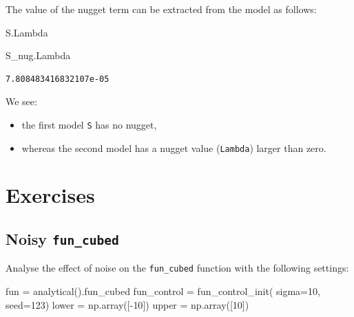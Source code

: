 \documentclass[
  letterpaper,
  DIV=11,
  numbers=noendperiod]{scrreprt}
\newenvironment{Shaded}{\begin{snugshade}}{\end{snugshade}}
\newcommand{\DecValTok}[1]{\textcolor[rgb]{0.68,0.00,0.00}{#1}}
\newcommand{\NormalTok}[1]{\textcolor[rgb]{0.00,0.23,0.31}{#1}}
\newcommand{\OperatorTok}[1]{\textcolor[rgb]{0.37,0.37,0.37}{#1}}
\providecommand{\tightlist}{%
  \setlength{\itemsep}{0pt}\setlength{\parskip}{0pt}}\usepackage{longtable,booktabs,array}
\begin{document}
The value of the nugget term can be extracted from the model as follows:

\begin{Shaded}
\begin{Highlighting}[]
\NormalTok{S.Lambda}
\end{Highlighting}
\end{Shaded}

\begin{Shaded}
\begin{Highlighting}[]
\NormalTok{S\_nug.Lambda}
\end{Highlighting}
\end{Shaded}

\begin{verbatim}
7.808483416832107e-05
\end{verbatim}

We see:

\begin{itemize}
\tightlist
\item
  the first model \texttt{S} has no nugget,
\item
  whereas the second model has a nugget value (\texttt{Lambda}) larger
  than zero.
\end{itemize}

\section{Exercises}\label{exercises-7}

\subsection{\texorpdfstring{Noisy
\texttt{fun\_cubed}}{Noisy fun\_cubed}}\label{noisy-fun_cubed-1}

Analyse the effect of noise on the \texttt{fun\_cubed} function with the
following settings:

\begin{Shaded}
\begin{Highlighting}[]
\NormalTok{fun }\OperatorTok{=}\NormalTok{ analytical().fun\_cubed}
\NormalTok{fun\_control }\OperatorTok{=}\NormalTok{ fun\_control\_init(    }
\NormalTok{    sigma}\OperatorTok{=}\DecValTok{10}\NormalTok{,}
\NormalTok{    seed}\OperatorTok{=}\DecValTok{123}\NormalTok{)}
\NormalTok{lower }\OperatorTok{=}\NormalTok{ np.array([}\OperatorTok{{-}}\DecValTok{10}\NormalTok{])}
\NormalTok{upper }\OperatorTok{=}\NormalTok{ np.array([}\DecValTok{10}\NormalTok{])}
\end{Highlighting}
\end{Shaded}
\end{document}
